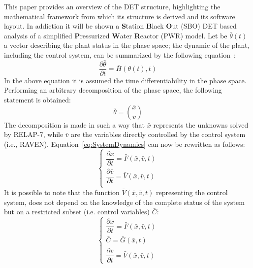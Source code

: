 \documentclass{mc2013}
\begin{document}
\vspace{-5mm}
This paper provides an overview of the DET structure, highlighting the mathematical framework from which its structure is derived and its software layout. In addiction it will be shown a \textbf{S}tation \textbf{B}lack \textbf{O}ut (SBO) DET based analysis of a simplified \textbf{P}ressurized \textbf{W}ater \textbf{R}eactor (PWR) model.
\vspace{-5mm}
\label{sec:mathFramework}
Let be $\bar{\theta}(t)$ a vector describing the plant status in the phase space; the dynamic of the plant, including the control system, can be summarized by the following equation~\cite{MathFrameworkMC2013}:
\begin{equation}
\frac{\partial \bar{\theta}}{\partial t} = \bar{H}(\theta(t),t)
\label{eq:SystemDynamics}
\end{equation}
In the above equation it is assumed the time differentiability in the phase space. Performing an arbitrary decomposition of the phase space, the following statement is obtained:
\begin{equation}
\bar{\theta}=\binom{\bar{x}}{\bar{v}}
\label{eq:firstDecomposition}
\end{equation}
The decomposition is made in such a way that $\bar{x}$ represents the unknowns solved by RELAP-7, while $\bar{v}$ are the variables directly controlled by the control system (i.e., RAVEN). Equation~\ref{eq:SystemDynamics} can now be rewritten as follows:
\begin{equation}
\begin{cases} 
\dfrac{\partial \bar{x}}{\partial t} = \bar{F}(\bar{x},\bar{v},t) \\ 
\dfrac{\partial \bar{v}}{\partial t} = \bar{V}(\bar{x},\bar{v},t) \\
\end{cases}
\label{eq:generalSystemEquation}
\end{equation}
It is possible to note that the function $\bar{V}(\bar{x},\bar{v},t)$ representing the control system, does not depend on the knowledge of the complete status of the system but on a restricted subset (i.e. control variables) $\bar{C}$:
\begin{equation}
\begin{cases} 
\dfrac{\partial \bar{x}}{\partial t} = \bar{F}(\bar{x},\bar{v},t) \\
\bar{C} = \bar{G}(\bar{x},t) \\ 
\dfrac{\partial \bar{v}}{\partial t} = \bar{V}(\bar{x},\bar{v},t) 
\end{cases}
\label{eq:generalSystemEquationwithControl}
\end{equation}
\end{document}
